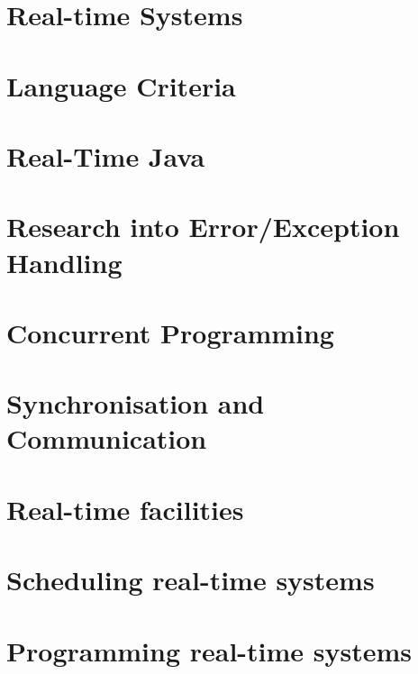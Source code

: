 



\section{Real-time Systems}

\section{Language Criteria}

\section{Real-Time Java} 

\section{Research into Error/Exception Handling}

\section{Concurrent Programming}

\section{Synchronisation and Communication}

\section{Real-time facilities}

\section{Scheduling real-time systems}

\section{Programming real-time systems}
